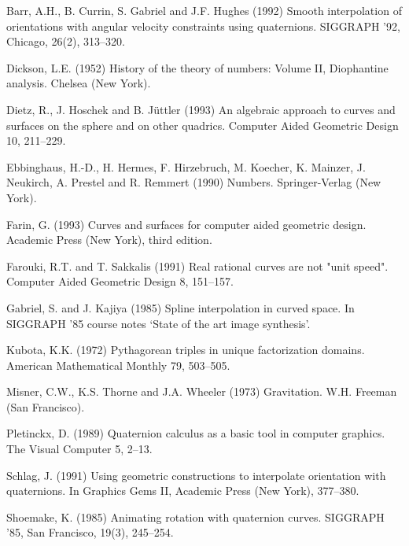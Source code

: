 
\begin{thebibliography}{Shoemake 85}

Barr, A.H., B. Currin, S. Gabriel and J.F. Hughes (1992)
Smooth interpolation of orientations with angular velocity
constraints using quaternions.  SIGGRAPH '92, Chicago, 26(2), 313--320.

Dickson, L.E. (1952) History of the theory of numbers: Volume II,
Diophantine analysis.  Chelsea (New York).

Dietz, R., J. Hoschek and B. J\"{u}ttler (1993)
An algebraic approach to curves and surfaces on the sphere and on other
quadrics.  Computer Aided Geometric Design 10, 211--229.

Ebbinghaus, H.-D., H. Hermes, F. Hirzebruch, M. Koecher, K. Mainzer,
J. Neukirch, A. Prestel and R. Remmert (1990)
Numbers.
Springer-Verlag (New York).

Farin, G. (1993) Curves and surfaces for computer aided geometric design.
Academic Press (New York), third edition.

Farouki, R.T. and T. Sakkalis (1991) Real rational curves are not
"unit speed".  Computer Aided Geometric Design 8, 151--157.

Gabriel, S. and J. Kajiya (1985) Spline interpolation in curved space.
In SIGGRAPH '85 course notes `State of the art image synthesis'.

Kubota, K.K. (1972) Pythagorean triples in unique factorization domains.
American Mathematical Monthly 79, 503--505.

Misner, C.W., K.S. Thorne and J.A. Wheeler (1973)
Gravitation.  W.H. Freeman (San Francisco).

Pletinckx, D. (1989) Quaternion calculus as a basic tool in computer graphics.
The Visual Computer 5, 2--13.

Schlag, J. (1991) Using geometric constructions to interpolate
orientation with quaternions.  In Graphics Gems II, Academic Press (New York),
377--380.


Shoemake, K. (1985) Animating rotation with quaternion curves.
SIGGRAPH '85, San Francisco, 19(3), 245--254.

\end{thebibliography}


